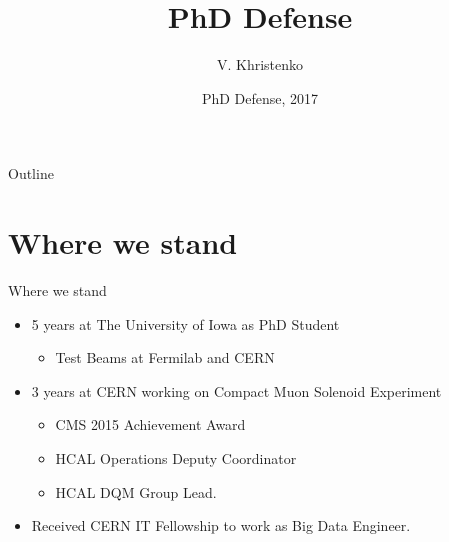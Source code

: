 \documentclass[pdf, 9pt]{beamer}
\title[PhD Defense]{PhD Defense}
\author[Viktor Khristenko]{V. Khristenko\inst{1}}
\institute[The University of Iowa]
{
  \inst{1}
  Department of Physics, The University of Iowa
}
\date[Defense 2017]
{PhD Defense, 2017}
\begin{document}
\begin{frame}
  \titlepage
\end{frame}

\begin{frame}{Outline}
  \tableofcontents
\end{frame}

%
%
\section*{Where we stand}
  \begin{frame}{Where we stand}
    \begin{itemize}
      \item 5 years at The University of Iowa as PhD Student
        \begin{itemize}
            \item Test Beams at Fermilab and CERN
        \end{itemize}
      \item 3 years at CERN working on Compact Muon Solenoid Experiment
        \begin{itemize}
          \item CMS 2015 Achievement Award
          \item HCAL Operations Deputy Coordinator
          \item HCAL DQM Group Lead.
        \end{itemize}
      \item Received CERN IT Fellowship to work as Big Data Engineer.
    \end{itemize}
  \end{frame}

%
%
\end{document}
